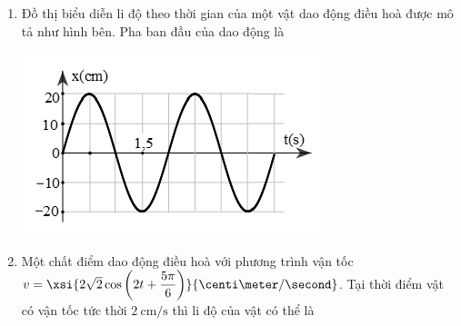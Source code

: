 \begin{enumerate}[label=\bfseries Câu \arabic*:]
\item 
{Đồ thị biểu diễn li độ theo thời gian của một vật dao động điều hoà được mô tả như hình bên. Pha ban đầu của dao động là
\begin{center}
	\includegraphics[width=0.4\linewidth]{../figs/D11-1-2}
\end{center}}
{}
{}

\item Một chất điểm dao động điều hoà với phương trình vận tốc $v=\xsi{2\sqrt{2}\cos\left(2t+\dfrac{5\pi}{6}\right)}{\centi\meter/\second}$. Tại thời điểm vật có vận tốc tức thời $\SI{2}{\centi\meter/\second}$ thì li độ của vật có thể là


\end{enumerate}
